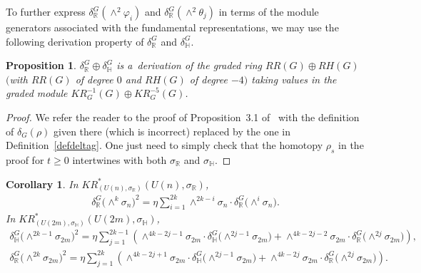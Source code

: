 \documentclass[11pt]{article}
\numberwithin{equation}{section}
\newtheorem{Corollary}[Theorem]{Corollary}
\newtheorem{Proposition}[Theorem]{Proposition}
{\theoremstyle{definition}
\newtheorem{Definition}[Theorem]{Definition}
\newtheorem{Example}[Theorem]{Example}
\newtheorem{Remark}[Theorem]{Remark}
}
\begin{document}
To further express $\delta_\mathbb{R}^G(\wedge^2\varphi_i)$ and $\delta_\mathbb{R}^G(\wedge^2\theta_j)$ in terms of the
module generators associated with the fundamental representations, we may use the following derivation property of
$\delta_\mathbb{R}^G$ and $\delta_\mathbb{H}^G$.
\begin{Proposition}
\label{eqderivative}
$\delta_\mathbb{R}^G\oplus\delta_\mathbb{H}^G$ is a~derivation of the graded ring $RR(G)\oplus RH(G)$ $($with $RR(G)$ of
degree $0$ and $RH(G)$ of degree $-4)$ taking values in the graded module $KR^{-1}_G(G)\oplus KR^{-5}_G(G)$.
\end{Proposition}
\begin{proof}
We refer the reader to the proof of Proposition~3.1 of~\cite{BZ}
with the def\/inition of $\delta_G(\rho)$ given there
(which is incorrect) replaced by the one in Def\/inition~\ref{defdeltag}.
One just need to simply check that the homotopy $\rho_s$ in the proof for $t\geq 0$ intertwines with both $\sigma_\mathbb{R}$ and $\sigma_\mathbb{H}$.
\end{proof}
\begin{Corollary}
\label{krringunitary}
In $KR^*_{(U(n),
\sigma_\mathbb{R})}(U(n),
\sigma_\mathbb{R})$,
\begin{gather*}
\delta_\mathbb{R}^G\big({\wedge}^k
\sigma_n\big)^2=\eta\sum\limits_{i=1}^{2k}\wedge^{2k-i}
\sigma_n\cdot\delta_\mathbb{R}^G\big({\wedge}^i
\sigma_n\big).
\end{gather*}
In $KR^*_{(U(2m),
\sigma_\mathbb{H})}(U(2m),
\sigma_\mathbb{H})$,
\begin{gather*}
\delta_\mathbb{H}^G\big({\wedge}^{2k-1}\sigma_{2m}\big)^2=\eta\sum\limits_{j=1}^{2k-1}\left(\wedge^{4k-2j-1}
\sigma_{2m}\cdot\delta_\mathbb{H}^G\big({\wedge}^{2j-1}\sigma_{2m}\big)+\wedge^{4k-2j-2}\sigma_{2m}
\cdot\delta_\mathbb{R}^G\big({\wedge}^{2j}\sigma_{2m}\big)\right),
\\
\delta_\mathbb{R}^G\big({\wedge}^{2k}\sigma_{2m}\big)^2=\eta\sum\limits_{j=1}^{2k}\left(\wedge^{4k-2j+1}
\sigma_{2m}\cdot\delta_\mathbb{H}^G\big({\wedge}^{2j-1}\sigma_{2m}\big)+\wedge^{4k-2j}\sigma_{2m}
\cdot\delta_\mathbb{R}^G\big({\wedge}^{2j}\sigma_{2m}\big)\right).
\end{gather*}
\end{Corollary}
\end{document}
